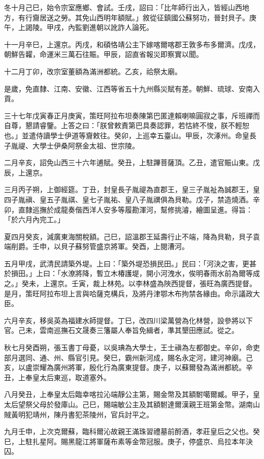 \begin{pinyinscope}
冬十月己巳，始令宗室應鄉、會試。壬戌，詔曰：「比年師行出入，皆經山西地方，有行齎居送之勞。其免山西明年額賦。」敘從征鎮國公蘇努功，晉封貝子。庚午，上謁陵。甲戌，內監劉進朝以訛詐人論死。

十一月辛巳，上還京。丙戌，和碩恪靖公主下嫁喀爾喀郡王敦多布多爾濟。戊戌，朝鮮告糶，命運米三萬石往賑。甲辰，詔直省報災即察實以聞。

十二月丁卯，改宗室董額為滿洲都統。乙亥，祫祭太廟。

是歲，免直隸、江南、安徽、江西等省五十九州縣災賦有差。朝鮮、琉球、安南入貢。

三十七年戊寅春正月庚寅，策旺阿拉布坦奏陳第巴匿達賴喇嘛圓寂之事，斥班禪而自尊，懇請睿鑒。上答之曰：「朕曾敕責第巴具奏認罪，若怙終不悛，朕不輕恕也。」並遣侍讀學士伊道等齎敕往。癸卯，上巡幸五臺山。甲辰，次涿州。命皇長子胤禔、大學士伊桑阿祭金太祖、世宗陵。

二月辛亥，詔免山西三十六年逋賦。癸丑，上駐蹕菩薩頂。乙丑，遣官賑山東。戊辰，上還京。

三月丙子朔，上御經筵。丁丑，封皇長子胤禔為直郡王，皇三子胤祉為誠郡王，皇四子胤禛、皇五子胤祺、皇七子胤祐、皇八子胤禩俱為貝勒。戊子，禁造燒酒。辛卯，直隸巡撫於成龍奏偕西洋人安多等履勘渾河，幫修挑濬，繪圖呈進。得旨：「於六月內完工。」

夏四月癸亥，減廣東海關稅額。己巳，詔溫郡王延壽行止不端，降為貝勒，貝子袁端削爵。壬申，以貝子蘇努管盛京將軍。癸酉，上閱漕河。

五月甲戌，武清民請築外堤。上曰：「築外堤恐損民田。」民曰：「河決之害，更甚於損田。」上曰：「水潦將降，暫立木椿護堤，開小河洩水，俟明春雨水前為爾等成之。」癸未，上還京。壬寅，裁上林苑。以李林盛為陜西提督，張旺為廣西提督。是月，策旺阿拉布坦上言與哈薩克構兵，及將丹津鄂木布拘禁各緣由。命示議政大臣。

六月辛亥，移吳英為福建水師提督。丁巳，改四川梁萬營為化林營，設參將以下官。己未，雲南巡撫石文晟奏三籓屬人奉旨免緝者，準其墾田應試。從之。

秋七月癸酉朔，張玉書丁母憂，以吳琠為大學士，王士禛為左都御史。辛卯，命吏部月選同、通、州、縣官引見。癸巳，霸州新河成，賜名永定河，建河神廟。己亥，以盧崇耀為廣州將軍，殷化行為廣東提督。庚子，以蘇爾發為滿洲都統。辛丑，上奉皇太后東巡，取道塞外。

八月癸丑，上奉皇太后臨幸喀拉沁端靜公主第，賜金幣及其額駙噶爾臧。甲子，皇太后望祭父母於發庫山。己巳，賜端敏公主及其額駙達爾漢親王班第金幣。湖南山賊黃明犯靖州，陳丹書犯茶陵州，官兵討平之。

九月壬申，上次克爾蘇，臨科爾沁故親王滿珠習禮墓前酹酒，孝莊皇后之父也。癸巳，上駐扎星阿。賜黑龍江將軍薩布素等金幣冠服。庚子，停盛京、烏拉本年決囚。


\end{pinyinscope}
